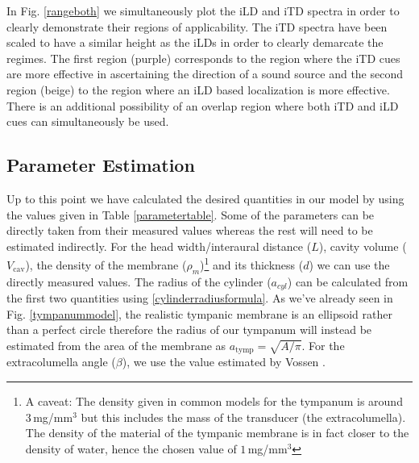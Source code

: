 In Fig. \ref{rangeboth} we simultaneously plot the iLD and iTD spectra in order to clearly demonstrate their regions of applicability. The iTD spectra
have been scaled to have a similar height as the iLDs in order to clearly demarcate the regimes. The first
region (purple) corresponds to the region where the iTD cues are more effective in ascertaining the direction of a sound source and the second
region (beige) to the region where an iLD based localization is more effective. There is an additional possibility of an overlap region where
both iTD and iLD cues can simultaneously be used.


% 
% 

\subsection{Parameter Estimation}\label{parameterestimation}
Up to this point we have calculated the desired quantities in our model by using the values given in Table \ref{parametertable}.
Some of the parameters can be directly taken from their measured values whereas
the rest will need to be estimated indirectly. 
For the head width/interaural distance ($L$), cavity volume ($V_{\mathrm{\mathrm{cav}}}$), the density of the membrane ($\rho_m$)\footnote{A caveat: The density given in common models for the tympanum
is around $3\,$mg/mm$^3$ but this includes the mass of the transducer (the extracolumella). The density of the material of the tympanic membrane is in fact closer to the density of water,
hence the chosen value of $1\,$mg/mm$^3$} and its thickness ($d$)
we can use the directly measured values. The radius of the cylinder ($a_{cyl}$) can be calculated from the first two quantities
using \eqref{cylinderradiusformula}. 
As we've already seen in Fig. \ref{tympanummodel}, the realistic tympanic membrane is an ellipsoid rather than a perfect circle therefore the radius of our tympanum will
instead be estimated from the area of the membrane as $a_{\mathrm{tymp}}=\sqrt{A/\pi}$. For the extracolumella angle ($\beta$), we use the value estimated by Vossen \cite{vossenjasa}.

